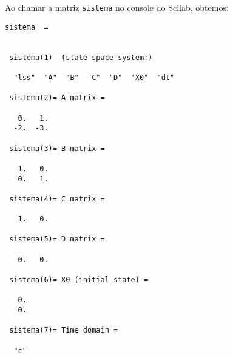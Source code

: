 Ao chamar a matriz \verb|sistema| no console do Scilab, obtemos:

\begin{verbatim}
sistema  = 


 sistema(1)  (state-space system:)

  "lss"  "A"  "B"  "C"  "D"  "X0"  "dt"

 sistema(2)= A matrix =

   0.   1.
  -2.  -3.

 sistema(3)= B matrix =

   1.   0.
   0.   1.

 sistema(4)= C matrix =

   1.   0.

 sistema(5)= D matrix =

   0.   0.

 sistema(6)= X0 (initial state) =

   0.
   0.

 sistema(7)= Time domain =

  "c"

\end{verbatim}